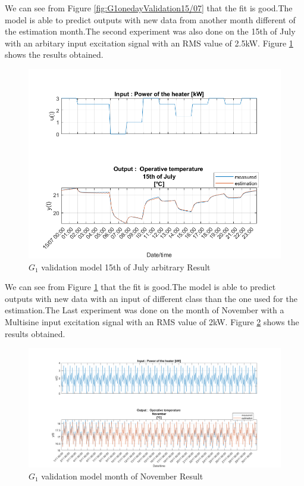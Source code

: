 \documentclass[a4paper,12pt]{article}
\numberwithin{equation}{section}
\begin{document}
\noindent
We can see from Figure \ref{fig:G1onedayValidation15/07} that the fit is good.The model is able to predict outputs with new data from another month different of the estimation month.The second experiment was also done on the 15th of July with an arbitary input excitation signal with an RMS value of 2.5kW. Figure \ref{fig:G1onedayValidation15/07Ran} shows the results obtained.

\begin{figure}[H]
    \includegraphics[width=\textwidth]{G1_15_07_RanIn.png}
    \centering
    \caption{$G_{1}$ validation model 15th of July arbitrary Result}
    \label{fig:G1onedayValidation15/07Ran}
\end{figure}

\noindent
We can see from Figure \ref{fig:G1onedayValidation15/07Ran} that the fit is good.The model is able to predict outputs with new data with an input of different class than the one used for the estimation.The Last experiment was  done on the month of November with a Multisine input excitation signal with an RMS value of 2kW. Figure \ref{fig:G1onedayValidationNov} shows the results obtained.

\begin{figure}[H]
    \includegraphics[width=\textwidth]{G1_val_NOV.png}
    \centering
    \caption{$G_{1}$ validation model month of November  Result}
    \label{fig:G1onedayValidationNov}
\end{figure}
\end{document}
